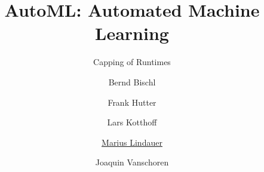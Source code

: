 




\title[AutoML: Overview]{AutoML: Automated Machine Learning}
\subtitle{Capping of Runtimes}
\author[Marius Lindauer]{Bernd Bischl \and Frank Hutter \and Lars Kotthoff\newline \and \underline{Marius Lindauer} \and Joaquin Vanschoren}
\institute{}
\date{}





	
	\maketitle


